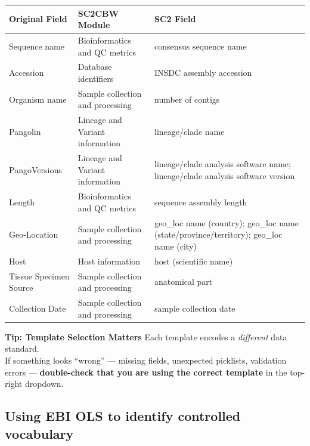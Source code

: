 \documentclass[
]{book}
\begin{document}
\begin{longtable}[]{@{}
  >{\raggedright\arraybackslash}p{}
  >{\raggedright\arraybackslash}p{}
  >{\raggedright\arraybackslash}p{}@{}}
\toprule\noalign{}
\begin{minipage}[b]{\linewidth}\raggedright
Original Field
\end{minipage} & \begin{minipage}[b]{\linewidth}\raggedright
SC2CBW Module
\end{minipage} & \begin{minipage}[b]{\linewidth}\raggedright
SC2 Field
\end{minipage} \\
\midrule\noalign{}
\endhead
\bottomrule\noalign{}
\endlastfoot
Sequence name & Bioinformatics and QC metrics & consensus sequence name \\
Accession & Database identifiers & INSDC assembly accession \\
Organism name & Sample collection and processing & number of contigs \\
Pangolin & Lineage and Variant information & lineage/clade name \\
PangoVersions & Lineage and Variant information & lineage/clade analysis software name; lineage/clade analysis software version \\
Length & Bioinformatics and QC metrics & sequence assembly length \\
Geo-Location & Sample collection and processing & geo\_loc name (country); geo\_loc name (state/province/territory); geo\_loc name (city) \\
Host & Host information & host (scientific name) \\
Tissue Specimen Source & Sample collection and processing & anatomical part \\
Collection Date & Sample collection and processing & sample collection date \\
\end{longtable}

\textbf{Tip: Template Selection Matters}
Each template encodes a \emph{different} data standard.\\
If something looks ``wrong'' --- missing fields, unexpected picklists, validation errors --- \textbf{double-check that you are using the correct template} in the top-right dropdown.

\subsection{Using EBI OLS to identify controlled vocabulary}\label{exercise4}
\end{document}
